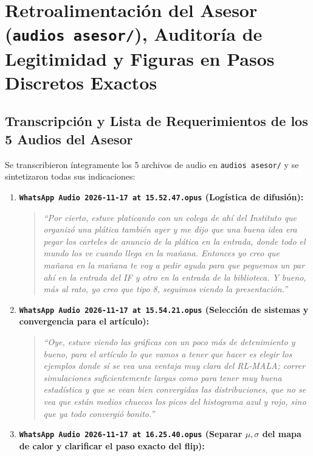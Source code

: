 \documentclass[10pt,a4paper]{article}
\begin{document}
\newpage
\section{Retroalimentación del Asesor (\texttt{audios asesor/}), Auditoría de Legitimidad y Figuras en Pasos Discretos Exactos}

\subsection{Transcripción y Lista de Requerimientos de los 5 Audios del Asesor}

Se transcribieron íntegramente los 5 archivos de audio en \texttt{audios asesor/} y se sintetizaron todas sus indicaciones:

\begin{enumerate}
\item \textbf{\texttt{WhatsApp Audio 2026-11-17 at 15.52.47.opus} (Logística de difusión):}
  \begin{quote}
  \textit{``Por cierto, estuve platicando con un colega de ahí del Instituto que organizó una plática también ayer y me dijo que una buena idea era pegar los carteles de anuncio de la plática en la entrada, donde todo el mundo los ve cuando llega en la mañana. Entonces yo creo que mañana en la mañana te voy a pedir ayuda para que peguemos un par ahí en la entrada del IF y otro en la entrada de la biblioteca. Y bueno, más al rato, yo creo que tipo 8, seguimos viendo la presentación.''}
  \end{quote}
\item \textbf{\texttt{WhatsApp Audio 2026-11-17 at 15.54.21.opus} (Selección de sistemas y convergencia para el artículo):}
  \begin{quote}
  \textit{``Oye, estuve viendo las gráficas con un poco más de detenimiento y bueno, para el artículo lo que vamos a tener que hacer es elegir los ejemplos donde sí se vea una ventaja muy clara del RL-MALA; correr simulaciones suficientemente largas como para tener muy buena estadística y que se vean bien convergidas las distribuciones, que no se vea que están medios chuecos los picos del histograma azul y rojo, sino que ya todo convergió bonito.''}
  \end{quote}
\item \textbf{\texttt{WhatsApp Audio 2026-11-17 at 16.25.40.opus} (Separar $\mu,\sigma$ del mapa de calor y clarificar el paso exacto del flip):}
  \begin{quote}

\end{quote}
\end{enumerate}
\end{document}
